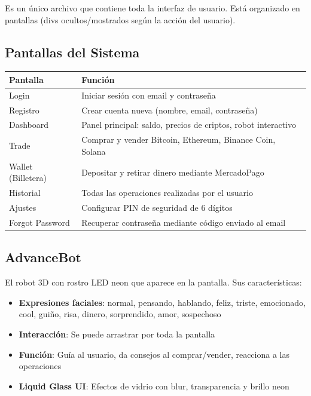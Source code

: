 \documentclass[12pt,oneside]{article}
\begin{document}
Es un único archivo que contiene toda la interfaz de usuario. Está organizado en pantallas (divs ocultos/mostrados según la acción del usuario).

\subsection{Pantallas del Sistema}

\begin{longtable}{|p{4cm}|p{10cm}|}
\hline
\textbf{Pantalla} & \textbf{Función} \\
\hline
Login & Iniciar sesión con email y contraseña \\
\hline
Registro & Crear cuenta nueva (nombre, email, contraseña) \\
\hline
Dashboard & Panel principal: saldo, precios de criptos, robot interactivo \\
\hline
Trade & Comprar y vender Bitcoin, Ethereum, Binance Coin, Solana \\
\hline
Wallet (Billetera) & Depositar y retirar dinero mediante MercadoPago \\
\hline
Historial & Todas las operaciones realizadas por el usuario \\
\hline
Ajustes & Configurar PIN de seguridad de 6 dígitos \\
\hline
Forgot Password & Recuperar contraseña mediante código enviado al email \\
\hline
\end{longtable}

\subsection{AdvanceBot}

El robot 3D con rostro LED neon que aparece en la pantalla. Sus características:

\begin{itemize}
    \item \textbf{Expresiones faciales}: normal, pensando, hablando, feliz, triste, emocionado, cool, guiño, risa, dinero, sorprendido, amor, sospechoso
    \item \textbf{Interacción}: Se puede arrastrar por toda la pantalla
    \item \textbf{Función}: Guía al usuario, da consejos al comprar/vender, reacciona a las operaciones
    \item \textbf{Liquid Glass UI}: Efectos de vidrio con blur, transparencia y brillo neon
\end{itemize}
\end{document}
